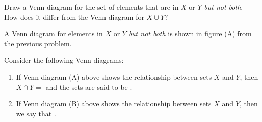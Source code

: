 \documentclass[nooutcomes]{ximera}
\begin{document}
\begin{problem}
Draw a Venn diagram for the set of elements that are in $X$ or $Y$ \emph{but not both}. 
How does it differ from the Venn diagram for $X\cup Y$?  
\begin{freeResponse}
\begin{hint}
A Venn diagram for elements in $X$ or $Y$ \emph{but not both} is shown in figure (A) from the previous problem.  
\end{hint}
\end{freeResponse}
\end{problem}

\begin{problem}
Consider the following Venn diagrams: 

%
%

\begin{enumerate}
\item If Venn diagram (A) above shows the relationship between sets $X$ and $Y$, then $X\cap Y =$  and the sets are said to be 
.  

\item If Venn diagram (B) above shows the relationship between sets $X$ and $Y$, then we say that .


\end{enumerate}
\end{problem}
\end{document}
